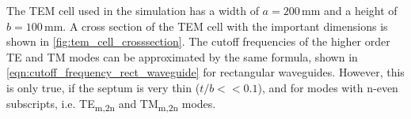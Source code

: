 



The TEM cell used in the simulation has a width of $a=200\,\mathrm{mm}$ and a height of $b=100\,\mathrm{mm}$. A cross section of the TEM cell with the important dimensions is shown in \autoref{fig:tem_cell_crosssection}. The cutoff frequencies of the higher order TE and TM modes can be approximated by the same formula, shown in \autoref{eqn:cutoff_frequency_rect_waveguide} for rectangular waveguides. However, this is only true, if the septum is very thin ($t/b << 0.1$), and for modes with n-even subscripts, i.e. TE\textsubscript{m,2n} and TM\textsubscript{m,2n} modes.

